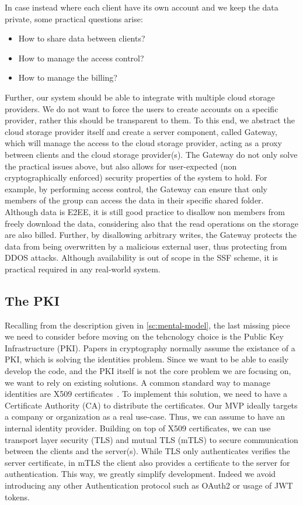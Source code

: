In case instead where each client have its own account
and we keep the data private,
some practical questions arise:
\begin{itemize}
    \item How to share data between clients?
    \item How to manage the access control?
    \item How to manage the billing?
\end{itemize}
Further, our system should be able to integrate with multiple
cloud storage providers. We do not want to force the users to
create accounts on a specific provider, rather this should be
transparent to them.
To this end, we abstract the cloud storage provider itself
and create a server component, called Gateway, which will manage
the access to the cloud storage provider, acting as a proxy
between clients and the cloud storage provider(s).
The Gateway do not only solve the practical issues above, but also
allows for user-expected (non cryptographically enforced) 
security properties of the system to hold.
For example, by performing access control, the Gateway can ensure
that only members of the group can access the data in their
specific shared folder. Although data is E2EE, it is still
good practice to disallow non members from freely download the data,
considering also that the read operations on the storage are also billed.
Further, by disallowing arbitrary writes, the Gateway
protects the data from being overwritten by a malicious external user,
thus protecting from DDOS attacks.
Although availability is out of scope in the SSF scheme,
it is practical required in any real-world system.

\subsection{The PKI}

Recalling from the description given in \cref{sc:mental-model},
the last missing piece we need to consider before moving
on the tehcnology choice is the Public Key Infrastructure (PKI).
Papers in cryptography normally assume the existance of a PKI,
which is solving the identities problem.
Since we want to be able to easily develop the code, and the PKI itself
is not the core problem we are focusing on, we want to rely on existing
solutions.
A common standard way to manage identities are X509 certificates~\cite{rfc5280}.
To implement this solution, we need to have a Certificate Authority (CA)
to distribute the certificates.
Our MVP ideally targets a company or organization as a real use-case. 
Thus, we can assume to have an internal identity provider.
Building on top of X509 certificates, we can use transport
layer security (TLS) and mutual TLS (mTLS) to 
secure communication between the clients and the server(s). 
While TLS only authenticates verifies the server certificate,
in mTLS the client also provides a certificate to the server
for authentication.
This way, we greatly simplify development. Indeed we 
avoid introducing any other Authentication
protocol such as OAuth2 or usage of JWT tokens.

